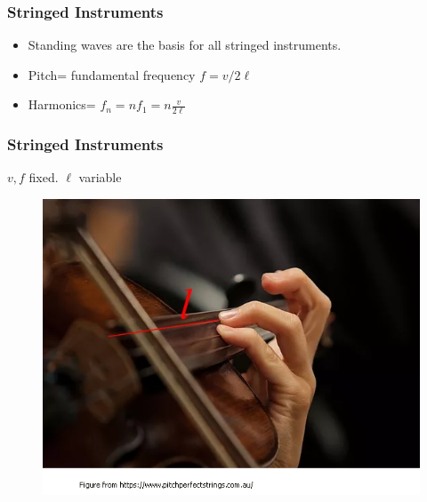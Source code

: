 \documentclass[]{beamer}
\begin{document}



\begin{frame}
\frametitle{Stringed Instruments}

\begin{itemize}
  \item Standing waves are the basis for all stringed instruments. \pause
  \item  Pitch= fundamental frequency $f=v/2\ell$ \pause
  \item Harmonics= $f_n=nf_1=n\frac{v}{2\ell}$ \pause
\end{itemize}





  \end{frame}





\begin{frame}
\frametitle{Stringed Instruments}
  \textcolor{mypink1}{$v,f$ fixed. \pause $\ell$ variable}

  

  \begin{figure}[h!]
    \begin{center}
      \includegraphics[height=2.in]{images4/pitch.jpg}
    \end{center}
  \end{figure}



\end{frame}
\end{document}
